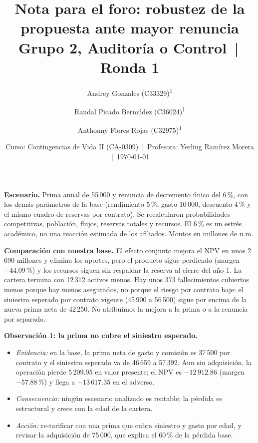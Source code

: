 \documentclass[10pt,a4paper]{article}
\title{\textbf{Nota para el foro: robustez de la propuesta ante mayor renuncia} \\[0.2em]
	\normalsize Grupo 2, Auditoría o Control \,|\, Ronda 1}
\author{%
	Andrey Gonzales (C33329)\textsuperscript{1} \and
	Randal Picado Bermúdez (C36024)\textsuperscript{1} \and
	Anthonny Flores Rojas (C32975)\textsuperscript{1}}
\date{Curso: Contingencias de Vida II (CA-0309) \,|\, Profesora: Yerling Ramírez Morera \,|\, \today}
\newcommand{\tabla}[1]{}
\begin{document}
	\maketitle
	\thispagestyle{fancy}

	\noindent\textbf{Escenario.} Prima anual de 55\,000 y renuncia de decremento único del 6\,\%, con los demás parámetros de la base (rendimiento 5\,\%, gasto 10\,000, descuento 4\,\% y el mismo cuadro de reservas por contrato). Se recalcularon probabilidades competitivas, población, flujos, reservas totales y recursos. El 6\,\% es un estrés académico, no una reacción estimada de los afiliados. Montos en millones de u.m.

	\begin{table}[h]
		\centering\small
		\tabla{S4_base_grupo2}
		\caption{Caso base frente al escenario del grupo 2 (prima de 55\,000 y renuncia del 6\,\%).}\label{tab:grupo2}
	\end{table}
	\vspace{-0.4em}

	\noindent\textbf{Comparación con nuestra base.} El efecto conjunto mejora el NPV en unos 2\,690 millones y elimina los aportes, pero el producto sigue perdiendo (margen \(-44.09\,\%\)) y los recursos siguen sin respaldar la reserva al cierre del año 1. La cartera termina con 12\,312 activos menos. Hay unos 373 fallecimientos cubiertos menos porque hay menos asegurados, no porque el riesgo por contrato baje: el siniestro esperado por contrato vigente (45\,900 a 56\,500) sigue por encima de la nueva prima neta de 42\,250. No atribuimos la mejora a la prima o a la renuncia por separado.

	\medskip
	\noindent\textbf{Observación 1: la prima no cubre el siniestro esperado.}
	\begin{itemize}
		\item \textit{Evidencia:} en la base, la prima neta de gasto y comisión es 37\,500 por contrato y el siniestro esperado va de 46\,659 a 57\,392. Aun sin adquisición, la operación pierde 5\,209.95 en valor presente; el NPV es \(-12\,912.86\) (margen \(-57.88\,\%\)) y llega a \(-13\,617.35\) en el adverso.
		\item \textit{Consecuencia:} ningún escenario analizado es rentable; la pérdida es estructural y crece con la edad de la cartera.
		\item \textit{Acción:} re-tarificar con una prima que cubra siniestro y gasto por edad, y revisar la adquisición de 75\,000, que explica el 60\,\% de la pérdida base.
	\end{itemize}
\end{document}
